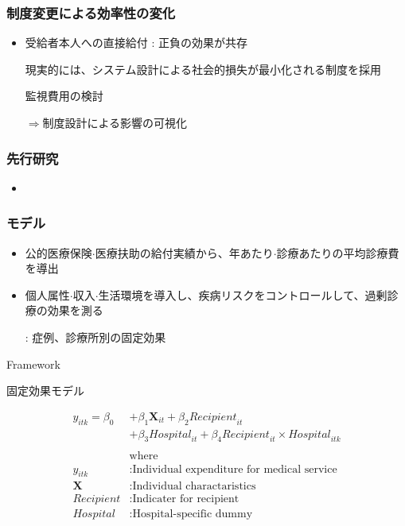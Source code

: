 \documentclass[dvipdfmx,14pt]{beamer}
\begin{document}
\begin{frame}\frametitle{制度変更による効率性の変化}

 \begin{itemize}
 
 \item 受給者本人への直接給付 : 正負の効果が共存
 
 現実的には、システム設計による社会的損失が最小化される制度を採用
 
 監視費用の検討
 
 $\Rightarrow$制度設計による影響の可視化
 
 
 \end{itemize}

\end{frame}

\begin{frame}\frametitle{先行研究}

 \begin{itemize}
 
 \item 
 
 \end{itemize}

\end{frame}

\begin{frame}\frametitle{モデル}

 \begin{itemize}
 
 \item 公的医療保険$\cdot$医療扶助の給付実績から、年あたり$\cdot$診療あたりの平均診療費を導出
 
 \item 個人属性$\cdot$収入$\cdot$生活環境を導入し、疾病リスクをコントロールして、過剰診療の効果を測る
 
 : 症例、診療所別の固定効果
 
 \end{itemize}

\end{frame}

\begin{frame}{Framework}

固定効果モデル

 \begin{align*}
  y_{itk} = \beta_0 &+ \beta_1 \mathbf{X}_{it} + \beta_2 \textit{Recipient}_{it}  \\
 & + \beta_3 \textit{Hospital}_{it} + \beta_4  \textit{Recipient}_{it} \times \textit{Hospital}_{itk}  \\
    \\
    & \text{where} \\
  y_{itk} &: \text{Individual expenditure for medical service} \\
  \mathbf{X} &: \text{Individual charactaristics} \\
  \textit{Recipient} & : \text{Indicater for recipient} \\
  \textit{Hospital} & : \text{Hospital-specific dummy}
  \end{align*}

\end{frame}
\end{document}
